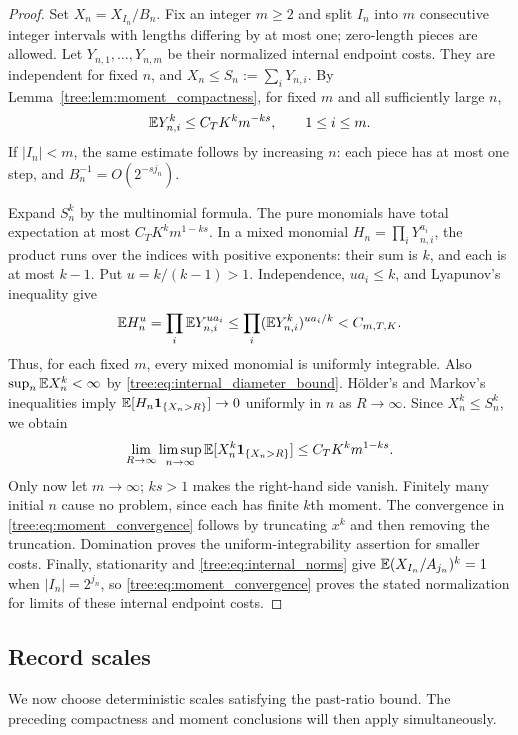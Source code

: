 \begin{proof}
Set $X_n=X_{I_n}/B_n$. Fix an integer $m\geq2$ and split $I_n$
into $m$ consecutive integer intervals with lengths differing by
at most one; zero-length pieces are allowed. Let $Y_{n,1},\ldots,
Y_{n,m}$ be their normalized internal endpoint costs. They are
independent for fixed $n$, and $X_n\leq S_n:=\sum_iY_{n,i}$.
By Lemma~\ref{tree:lem:moment_compactness}, for fixed $m$ and all
sufficiently large $n$,
\begin{equation}\label{tree:eq:ui_piece_bound}
 \mathbb E Y_{n,i}^k\leq C_TK^k m^{-ks},\qquad 1\leq i\leq m.
\end{equation}
If $|I_n|<m$, the same estimate follows by increasing $n$: each
piece has at most one step, and $B_n^{-1}=O(2^{-sj_n})$.

Expand $S_n^k$ by the multinomial formula. The pure monomials have
total expectation at most $C_TK^k m^{1-ks}$. In a mixed monomial
$H_n=\prod_iY_{n,i}^{a_i}$, the product runs over the indices with
positive exponents: their sum is $k$, and each is at most $k-1$.
Put $u=k/(k-1)>1$.
Independence, $ua_i\leq k$, and Lyapunov's inequality give
\[
 \mathbb E H_n^u=\prod_i\mathbb E Y_{n,i}^{ua_i}
 \leq\prod_i(\mathbb E Y_{n,i}^k)^{ua_i/k}<C_{m,T,K}.
\]
Thus, for each fixed $m$, every mixed monomial is uniformly
integrable. Also $\sup_n\mathbb E X_n^k<\infty$ by
\eqref{tree:eq:internal_diameter_bound}. H\"older's and Markov's
inequalities imply
$\mathbb E[H_n\mathbf1_{\{X_n>R\}}]\to0$ uniformly in $n$ as
$R\to\infty$. Since $X_n^k\leq S_n^k$, we obtain
\[
 \lim_{R\to\infty}\limsup_{n\to\infty}
 \mathbb E[X_n^k\mathbf1_{\{X_n>R\}}]
 \leq C_TK^k m^{1-ks}.
\]
Only now let $m\to\infty$; $ks>1$ makes the right-hand side vanish.
Finitely many initial $n$ cause no problem, since each has finite
$k$th moment. The convergence in \eqref{tree:eq:moment_convergence}
follows by truncating $x^k$ and then removing the truncation.
Domination proves the uniform-integrability assertion for
smaller costs. Finally, stationarity and
\eqref{tree:eq:internal_norms} give
$\mathbb E(X_{I_n}/A_{j_n})^k=1$ when $|I_n|=2^{j_n}$, so
\eqref{tree:eq:moment_convergence} proves the stated normalization
for limits of these internal endpoint costs.
\end{proof}

\subsection{Record scales}

We now choose deterministic scales satisfying the past-ratio bound.
The preceding compactness and moment conclusions will then apply
simultaneously.

